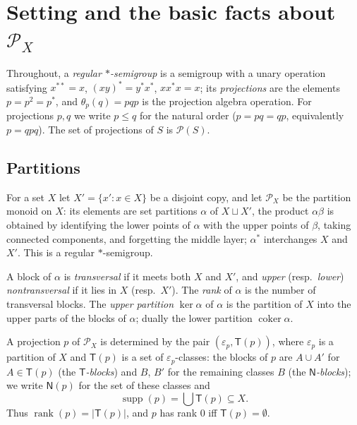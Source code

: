 \documentclass[11pt]{amsart}
\theoremstyle{definition}
\renewcommand{\P}{\mathcal{P}}
\newcommand{\supp}{\operatorname{supp}}
\newcommand{\T}{\mathsf{T}}
\newcommand{\N}{\mathsf{N}}
\newcommand{\rk}{\operatorname{rank}}
\begin{document}
\begin{abstract}
bipartite graphs; (6) report computations: every regular $*$-semigroup of order $\le 8$ satisfying the projection condition embeds in a partition monoid (in $\P_5$ if it is not inverse), and every projection algebra of order $\le5$ satisfying the projection and triangle conditions embeds in $\P(\P_4)$; and (7) make some general remarks (for finite $S$ the quasi-identities of $\{\P_X\}$ decide embeddability; $\P_X$ embeds in the involuted semigroup of binary relations on $2^X$).
\end{abstract}

\tableofcontents

\section{Setting and the basic facts about $\P_X$}\label{sec:setup}

Throughout, a \emph{regular $*$-semigroup} is a semigroup with a unary operation satisfying $x^{**}=x$, $(xy)^*=y^*x^*$, $xx^*x=x$; its \emph{projections} are the elements $p=p^2=p^*$, and $\theta_p(q)=pqp$ is the projection algebra operation. For projections $p,q$ we write $p\le q$ for the natural order ($p=pq=qp$, equivalently $p=qpq$). The set of projections of $S$ is $\P(S)$.

\subsection{Partitions}
For a set $X$ let $X'=\{x':x\in X\}$ be a disjoint copy, and let $\P_X$ be the partition monoid on $X$: its elements are set partitions $\alpha$ of $X\sqcup X'$, the product $\alpha\beta$ is obtained by identifying the lower points of $\alpha$ with the upper points of $\beta$, taking connected components, and forgetting the middle layer; $\alpha^*$ interchanges $X$ and $X'$. This is a regular $*$-semigroup.

A block of $\alpha$ is \emph{transversal} if it meets both $X$ and $X'$, and \emph{upper} (resp.\ \emph{lower}) \emph{nontransversal} if it lies in $X$ (resp.\ $X'$). The \emph{rank} of $\alpha$ is the number of transversal blocks. The \emph{upper partition} $\ker\alpha$ of $\alpha$ is the partition of $X$ into the upper parts of the blocks of $\alpha$; dually the lower partition $\operatorname{coker}\alpha$.

A projection $p$ of $\P_X$ is determined by the pair $(\varepsilon_p,\T(p))$, where $\varepsilon_p$ is a partition of $X$ and $\T(p)$ is a set of $\varepsilon_p$-classes: the blocks of $p$ are $A\cup A'$ for $A\in\T(p)$ (the \emph{$\T$-blocks}) and $B$, $B'$ for the remaining classes $B$ (the \emph{$\N$-blocks}); we write $\N(p)$ for the set of these classes and
\[
\supp(p)=\textstyle\bigcup\T(p)\subseteq X .
\]
Thus $\rk(p)=|\T(p)|$, and $p$ has rank $0$ iff $\T(p)=\emptyset$.
\end{document}
